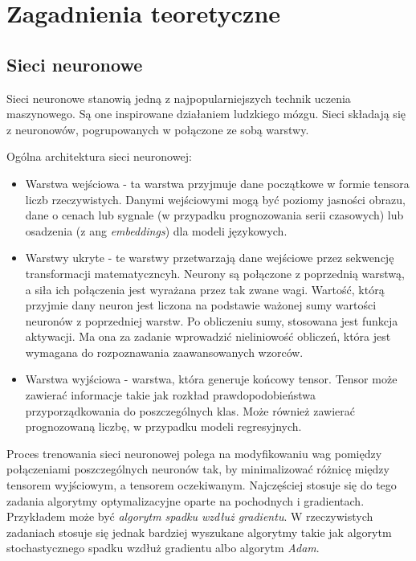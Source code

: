 \chapter{Zagadnienia teoretyczne}


\section{Sieci neuronowe}

Sieci neuronowe stanowią jedną z najpopularniejszych technik uczenia maszynowego. Są one inspirowane działaniem ludzkiego mózgu. Sieci składają się z neuronowów, pogrupowanych w połączone ze sobą warstwy.

Ogólna architektura sieci neuronowej:
\begin{itemize}
    \item Warstwa wejściowa - ta warstwa przyjmuje dane początkowe w formie tensora liczb rzeczywistych. Danymi wejściowymi mogą być poziomy jasności obrazu, dane o cenach lub sygnale (w przypadku prognozowania serii czasowych) lub osadzenia (z ang \textit{embeddings}) dla modeli językowych.
    \item Warstwy ukryte - te warstwy przetwarzają dane wejściowe przez sekwencję transformacji matematyczncyh. Neurony są połączone z poprzednią warstwą, a siła ich połączenia jest wyrażana przez tak zwane wagi. Wartość, którą przyjmie dany neuron jest liczona na podstawie ważonej sumy wartości neuronów z poprzedniej warstw. Po obliczeniu sumy, stosowana jest funkcja aktywacji. Ma ona za zadanie wprowadzić nieliniowość obliczeń, która jest wymagana do rozpoznawania zaawansowanych wzorców.
    \item Warstwa wyjściowa - warstwa, która generuje końcowy tensor. Tensor może zawierać informacje takie jak rozkład prawdopodobieństwa przyporządkowania do poszczególnych klas. Może również zawierać prognozowaną liczbę, w przypadku modeli regresyjnych.
\end{itemize}

Proces trenowania sieci neuronowej polega na modyfikowaniu wag pomiędzy połączeniami poszczególnych neuronów tak, by minimalizować różnicę między tensorem wyjściowym, a tensorem oczekiwanym.
Najczęściej stosuje się do tego zadania algorytmy optymalizacyjne oparte na pochodnych i gradientach. Przykładem może być \textit{algorytm spadku wzdłuż gradientu}.
W rzeczywistych zadaniach stosuje się jednak bardziej wyszukane algorytmy takie jak algorytm stochastycznego spadku wzdłuż gradientu albo algorytm \textit{Adam}.

